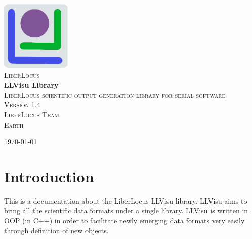 \documentclass{article}
\begin{document}
\begin{titlepage}
\begin{center}

\includegraphics[width=0.25\textwidth]{figures/LLlogo.eps}~\\[1cm]

\textsc{\LARGE LiberLocus}\\[1.5cm]

{ \huge \bfseries LLVisu Library}\\[0.4cm]

\textsc{\Large LiberLocus scientific output generation library for serial software}\\[0.5cm]

\textsc{Version 1.4}\\[3.5cm]

\textsc{\Large LiberLocus Team}\\[1.5cm]

\textsc{\Large Earth}\\[0.5cm]

\vfill

{\large \today}

\end{center}
\end{titlepage}


\section{Introduction}
\label{sec:intro}

This is a documentation about the LiberLocus LLVisu library. LLVisu aims to bring all the scientific data formats under a single library. LLVisu is written in OOP (in C++) in order to facilitate newly emerging data formats very easily through definition of new objects.
\end{document}

